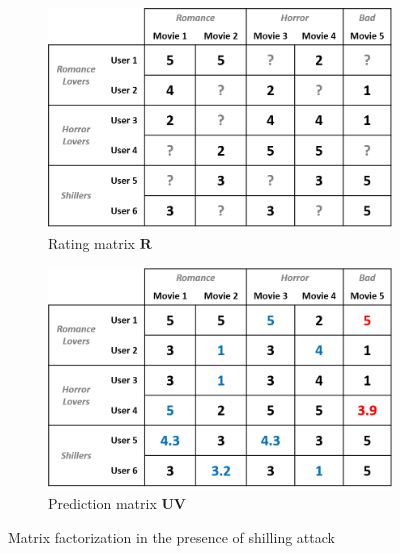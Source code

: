 \documentclass[master,english,final]{kaist-ucs}
\begin{document}
\begin{figure}[t]
    \centering
    \begin{subfigure}[b]{0.45\textwidth}
        \centering
        \includegraphics[width=\textwidth]{figure/mf_after_rating}
        \caption{Rating matrix $\bm{R}$}
        \label{mf_after_rating}
    \end{subfigure}
    \begin{subfigure}[b]{0.45\textwidth}
        \centering
        \includegraphics[width=\textwidth]{figure/mf_after_prediction}
        \caption{Prediction matrix $\bm{UV}$}
        \label{mf_after_prediction}
    \end{subfigure}
    \caption{Matrix factorization in the presence of shilling attack}
    \label{mf_attacked}
\end{figure}




%
\end{document}
